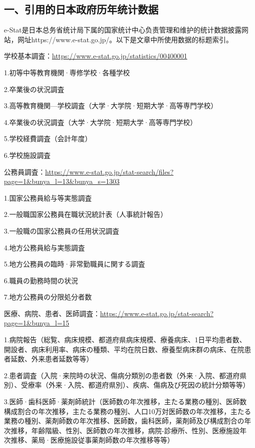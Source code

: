 

\subsection{一、引用的日本政府历年统计数据}

e-Stat是日本总务省统计局下属的国家统计中心负责管理和维护的统计数据披露网站，网址https://www.e-stat.go.jp/。以下是文章中所使用数据的标题索引。

学校基本調査：\url{https://www.e-stat.go.jp/statistics/00400001}

1.初等中等教育機関·専修学校·各種学校

2.卒業後の状況調査

3.高等教育機関—学校調査（大学·大学院·短期大学·高等専門学校）

4.卒業後の状況調査（大学·大学院·短期大学·高等専門学校）

5.学校経費調査（会計年度）

6.学校施設調査

公務員調査：\url{https://www.e-stat.go.jp/stat-search/files?page=1&bunya_l=13&bunya_s=1303}

1.国家公務員給与等実態調査

2.一般職国家公務員在職状況統計表（人事統計報告）

3.一般職の国家公務員の任用状況調査

4.地方公務員給与実態調査

5.地方公務員の臨時·非常勤職員に関する調査

6.職員の勤務時間の状況

7.地方公務員の分限処分者数

医療、病院、患者、医師調査：\url{https://www.e-stat.go.jp/stat-search?page=1&bunya_l=15}

1.病院報告（総覧、病床規模、都道府県病床規模、療養病床、1日平均患者数、開設者、病床利用率、病床の種類、平均在院日数、療養型病床群の病床、在院患者延数、外来患者延数等等）

2.患者調査（入院·来院時の状況、傷病分類別の患者数（外来·入院、都道府県別）、受療率（外来·入院、都道府県別）、疾病、傷病及び死因の統計分類等等）

3.医師·歯科医師·薬剤師統計（医師数の年次推移，主たる業務の種別、医師数構成割合の年次推移，主たる業務の種別、人口10万対医師数の年次推移，主たる業務の種別、薬剤師数の年次推移、医師数，歯科医師，薬剤師及び構成割合の年次推移，年齢階級、性別、医師数の年次推移，病院-診療所、性別、医療施設年次推移、薬局·医療施設従事薬剤師数の年次推移等等）

